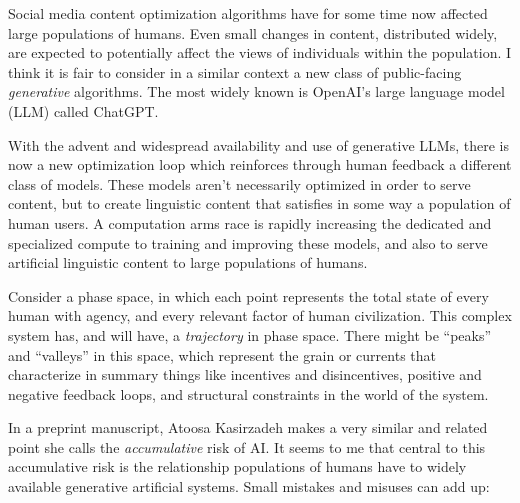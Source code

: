 \documentclass[11pt, oneside]{article}   	%
\begin{document}



Social media content optimization algorithms have for some time now affected large populations of humans.  Even small changes in content, distributed widely, are expected to potentially affect the views of individuals within the population.  I think it is fair to consider in a similar context a new class of public-facing \emph{generative} algorithms.  The most widely known is OpenAI's large language model (LLM) called ChatGPT.

With the advent and widespread availability and use of generative LLMs, there is now a new optimization loop which reinforces through human feedback a different class of models.  These models aren't necessarily optimized in order to serve content, but to create linguistic content that satisfies in some way a population of human users.  A computation arms race is rapidly increasing the dedicated and specialized compute to training and improving these models, and also to serve artificial linguistic content to large populations of humans.








Consider a phase space, in which each point represents the total state of every human with agency, and every relevant factor of human civilization.  This complex system has, and will have, a \emph{trajectory} in phase space.  There might be ``peaks'' and ``valleys'' in this space, which represent the grain or currents that characterize in summary things like incentives and disincentives, positive and negative feedback loops, and structural constraints in the world of the system.



In a preprint manuscript, Atoosa Kasirzadeh makes a very similar and related point she calls the \emph{accumulative} risk of AI. \citep{Kasirzadeh2024WIP}  It seems to me that central to this accumulative risk is the relationship populations of humans have to widely available generative artificial systems.  Small mistakes and misuses can add up: 
\end{document}
